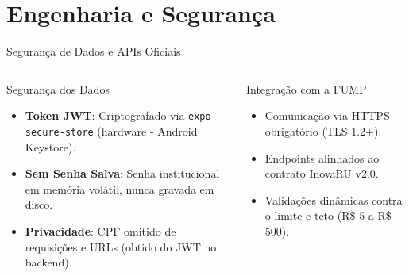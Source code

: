 \documentclass[10pt, aspectratio=169]{beamer}
\begin{document}
\section{Engenharia e Segurança}

\begin{frame}{Segurança de Dados e APIs Oficiais}
  \begin{columns}[T,onlytextwidth]
      \begin{block}{Segurança dos Dados}
        \small
        \begin{itemize}
          \item \textbf{Token JWT}: Criptografado via \texttt{expo-secure-store} (hardware - Android Keystore).
          \item \textbf{Sem Senha Salva}: Senha institucional em memória volátil, nunca gravada em disco.
          \item \textbf{Privacidade}: CPF omitido de requisições e URLs (obtido do JWT no backend).
        \end{itemize}
      \end{block}

      \begin{exampleblock}{Integração com a FUMP}
        \small
        \begin{itemize}
          \item Comunicação via HTTPS obrigatório (TLS 1.2+).
          \item Endpoints alinhados ao contrato InovaRU v2.0.
          \item Validações dinâmicas contra o limite e teto (R\$ 5 a R\$ 500).
        \end{itemize}
      \end{exampleblock}
  \end{columns}
\end{frame}
\end{document}
